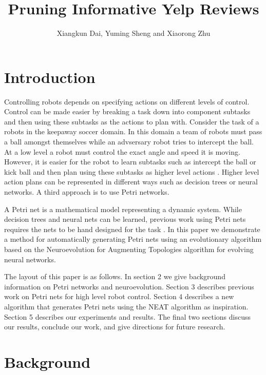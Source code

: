 \documentclass[12pt,a4paper,twocolumn]{article}
\author{Xiangkun Dai, Yuming Sheng and Xiaorong Zhu}
\title{Pruning Informative Yelp Reviews}
\begin{document}
\maketitle

\begin{abstract}


\end{abstract}

\section{Introduction}

Controlling robots depends on specifying actions on different levels of control. Control can be made easier by breaking a task down into component subtasks and then using these subtasks as the actions to plan with. Consider the task of a robots in the keepaway soccer domain. In this domain a team of robots must pass a ball amongst themselves while an advsersary robot tries to intercept the ball. At a low level a robot must control the exact angle and speed it is moving. However, it is easier for the robot to learn subtasks such as intercept the ball or kick ball and then plan using these subtasks as higher level actions \cite{whiteson}. Higher level action plans can be represented in different ways such as decision trees or neural networks. A third approach is to use Petri networks. 

A Petri net is a mathematical model representing a dynamic system. While decision trees and neural nets can be learned, previous work using Petri nets requires the nets to be hand designed for the task \cite{ziparo2011petri}. In this paper we demonstrate a method for automatically generating Petri nets using an evolutionary algorithm based on the Neuroevolution for Augmenting Topologies algorithm for evolving neural networks.

The layout of this paper is as follows. In section 2 we give background information on Petri networks and neuroevolution. Section 3 describes previous work on Petri nets for high level robot control. Section 4 describes a new algorithm that generates Petri nets using the NEAT algorithm as inspiration. Section 5 describes our experiments and results. The final two sections discuss our results, conclude our work, and give directions for future research.


\section{Background}
\end{document}
